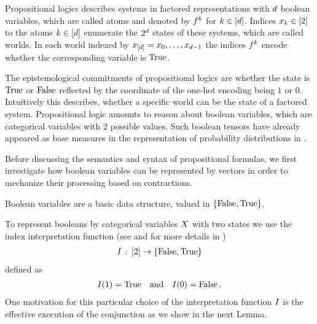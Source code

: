 \chapter{\chatextlogicalRepresentation}\label{cha:logicalRepresentation}

Propositional logics describes systems in factored representations with $d$ boolean variables, which are called atoms and denoted by $f^{k}$ for $k\in[d]$.
Indices $x_{k}\in[2]$ to the atoms $k\in[d]$ enumerate the $2^d$ states of these systems, which are called worlds.
In each world indexed by $x_{[d]}=x_{0},\ldots,x_{d-1}$ the indices $f^{k}$ encode whether the corresponding variable is $\mathrm{True}$.

The epistemological commitments of propositional logics are whether the state is $\mathrm{True}$ or $\mathrm{False}$ reflected by the coordinate of the one-hot encoding being $1$ or $0$.
Intuitively this describes, whether a specific world can be the state of a factored system.
Propositional logic amounts to reason about boolean variables, which are categorical variables with $2$ possible values.
Such boolean tensors have already appeared as base measures in the representation of probability distributions in .

Before discussing the semantics and syntax of propositional formulas, we first investigate how boolean variables can be represented by vectors in order to mechanize their processing based on contractions.



\label{sec:booleanEncoding}

Boolean variables are a basic data structure, valued in $\{\mathrm{False},\mathrm{True}\}$.


To represent booleans by categorical variables $X$ with two states we use the index interpretation function (see  and for more details  in )
\begin{align*}
    I \,:\, [2]\rightarrow\{\mathrm{False},\mathrm{True}\}
\end{align*}
defined as
\begin{align*}
    I(1) = \mathrm{True}
    \quad\text{and}\quad I(0) = \mathrm{False} \, .
\end{align*}
One motivation for this particular choice of the interpretation function $I$ is the effective execution of the conjunction as we show in the next Lemma.

